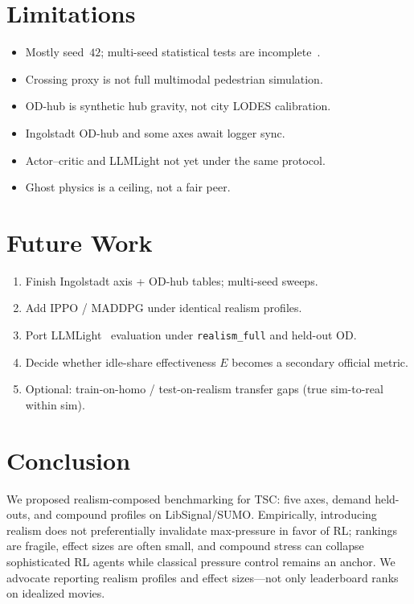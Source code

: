 \documentclass[11pt,a4paper]{article}
\begin{document}
\section{Limitations}
\label{sec:limitations}

\begin{itemize}
  \item Mostly seed~$42$; multi-seed statistical tests are incomplete~\citep{colas2018seeds}.
  \item Crossing proxy is not full multimodal pedestrian simulation.
  \item OD-hub is synthetic hub gravity, not city LODES calibration.
  \item Ingolstadt OD-hub and some axes await logger sync.
  \item Actor--critic and LLMLight not yet under the same protocol.
  \item Ghost physics is a ceiling, not a fair peer.
\end{itemize}

\section{Future Work}
\label{sec:future}

\begin{enumerate}
  \item Finish Ingolstadt axis + OD-hub tables; multi-seed sweeps.
  \item Add IPPO / MADDPG under identical realism profiles.
  \item Port LLMLight~\citep{lai2024llmlight} evaluation under \texttt{realism\_full} and held-out OD.
  \item Decide whether idle-share effectiveness $E$ becomes a secondary official metric.
  \item Optional: train-on-homo / test-on-realism transfer gaps (true sim-to-real within sim).
\end{enumerate}

\section{Conclusion}
\label{sec:conclusion}

We proposed realism-composed benchmarking for TSC: five axes, demand held-outs, and compound profiles on LibSignal/SUMO.
Empirically, introducing realism does not preferentially invalidate max-pressure in favor of RL; rankings are fragile, effect sizes are often small, and compound stress can collapse sophisticated RL agents while classical pressure control remains an anchor.
We advocate reporting realism profiles and effect sizes---not only leaderboard ranks on idealized movies.
\end{document}
